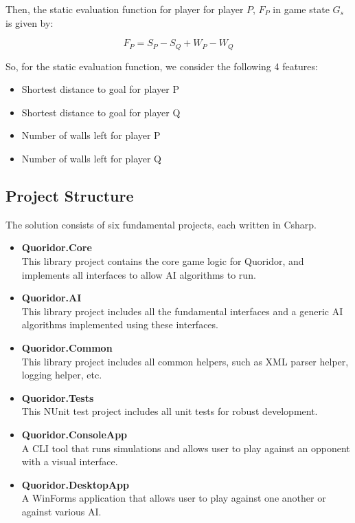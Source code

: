 Then, the static evaluation function for player for player $P$, $F_P$ in game state $G_s$ is given by:

\begin{equation}
    F_P = S_P - S_Q + W_P - W_Q
\end{equation}

So, for the static evaluation function, we consider the following 4 features:
\begin{itemize}
    \item Shortest distance to goal for player P
    \item Shortest distance to goal for player Q
    \item Number of walls left for player P
    \item Number of walls left for player Q
\end{itemize}

\subsection{Project Structure}

The solution consists of six fundamental projects, each written in \gls{Csharp}.

\begin{itemize}
    \item \textbf{Quoridor.Core}\\
        This library project contains the core game logic for Quoridor, and implements all interfaces to allow \gls{AI} algorithms to run.
        
    \item \textbf{Quoridor.AI}\\
        This library project includes all the fundamental interfaces and a generic \gls{AI} algorithms implemented using these interfaces.

    \item \textbf{Quoridor.Common}\\
        This library project includes all common helpers, such as XML parser helper, logging helper, etc.

    \item \textbf{Quoridor.Tests}\\
        This NUnit test project includes all unit tests for robust development.

    \item \textbf{Quoridor.ConsoleApp}\\
        A CLI tool that runs simulations and allows user to play against an opponent with a visual interface.

    \item \textbf{Quoridor.DesktopApp}\\
        A WinForms application that allows user to play against one another or against various \gls{AI}.
\end{itemize}

